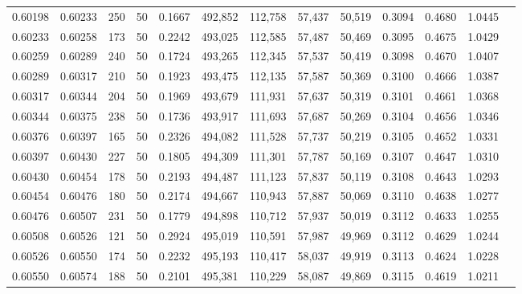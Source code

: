\begin{tabular}{rrrrrrrrrrrrr}
0.60198 & 0.60233 &   250 &  50 &                                     0.1667 & 492,852 & 112,758 &  57,437 &  50,519 & 0.3094 & 0.4680 & 1.0445 \\
0.60233 & 0.60258 &   173 &  50 &                                     0.2242 & 493,025 & 112,585 &  57,487 &  50,469 & 0.3095 & 0.4675 & 1.0429 \\
0.60259 & 0.60289 &   240 &  50 &                                     0.1724 & 493,265 & 112,345 &  57,537 &  50,419 & 0.3098 & 0.4670 & 1.0407 \\
0.60289 & 0.60317 &   210 &  50 &                                     0.1923 & 493,475 & 112,135 &  57,587 &  50,369 & 0.3100 & 0.4666 & 1.0387 \\
0.60317 & 0.60344 &   204 &  50 &                                     0.1969 & 493,679 & 111,931 &  57,637 &  50,319 & 0.3101 & 0.4661 & 1.0368 \\
0.60344 & 0.60375 &   238 &  50 &                                     0.1736 & 493,917 & 111,693 &  57,687 &  50,269 & 0.3104 & 0.4656 & 1.0346 \\
0.60376 & 0.60397 &   165 &  50 &                                     0.2326 & 494,082 & 111,528 &  57,737 &  50,219 & 0.3105 & 0.4652 & 1.0331 \\
0.60397 & 0.60430 &   227 &  50 &                                     0.1805 & 494,309 & 111,301 &  57,787 &  50,169 & 0.3107 & 0.4647 & 1.0310 \\
0.60430 & 0.60454 &   178 &  50 &                                     0.2193 & 494,487 & 111,123 &  57,837 &  50,119 & 0.3108 & 0.4643 & 1.0293 \\
0.60454 & 0.60476 &   180 &  50 &                                     0.2174 & 494,667 & 110,943 &  57,887 &  50,069 & 0.3110 & 0.4638 & 1.0277 \\
0.60476 & 0.60507 &   231 &  50 &                                     0.1779 & 494,898 & 110,712 &  57,937 &  50,019 & 0.3112 & 0.4633 & 1.0255 \\
0.60508 & 0.60526 &   121 &  50 &                                     0.2924 & 495,019 & 110,591 &  57,987 &  49,969 & 0.3112 & 0.4629 & 1.0244 \\
0.60526 & 0.60550 &   174 &  50 &                                     0.2232 & 495,193 & 110,417 &  58,037 &  49,919 & 0.3113 & 0.4624 & 1.0228 \\
0.60550 & 0.60574 &   188 &  50 &                                     0.2101 & 495,381 & 110,229 &  58,087 &  49,869 & 0.3115 & 0.4619 & 1.0211 \\

\end{tabular}
